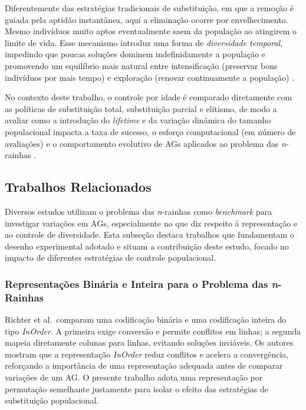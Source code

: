 Diferentemente das estratégias tradicionais de substituição, em que a remoção é guiada pela aptidão instantânea, aqui a eliminação ocorre por envelhecimento. Mesmo indivíduos muito aptos eventualmente saem da população ao atingirem o limite de vida. Esse mecanismo introduz uma forma de \textit{diversidade temporal}, impedindo que poucas soluções dominem indefinidamente a população e promovendo um equilíbrio mais natural entre intensificação (preservar bons indivíduos por mais tempo) e exploração (renovar continuamente a população) \cite{michalewicz1993genetic}.

No contexto deste trabalho, o controle por idade é comparado diretamente com as políticas de substituição total, substituição parcial e elitismo, de modo a avaliar como a introdução do \textit{lifetime} e da variação dinâmica do tamanho populacional impacta a taxa de sucesso, o esforço computacional (em número de avaliações) e o comportamento evolutivo de AGs aplicados ao problema das \textit{n}-rainhas \cite{richter2012algoritmo,sarkar2017adaptive,ali2023performance}.
\subsection{Trabalhos Relacionados}

Diversos estudos utilizam o problema das \textit{n}-rainhas como \textit{benchmark} para investigar variações em AGs, especialmente no que diz respeito à representação e ao controle de diversidade. Esta subseção destaca trabalhos que fundamentam o desenho experimental adotado e situam a contribuição deste estudo, focado no impacto de diferentes estratégias de controle populacional.

\subsubsection{Representações Binária e Inteira para o Problema das \textit{n}-Rainhas \cite{richter2012algoritmo}}

Richter et al.\ comparam uma codificação binária e uma codificação inteira do tipo \textit{InOrder}. A primeira exige conversão e permite conflitos em linhas; a segunda mapeia diretamente colunas para linhas, evitando soluções inviáveis. Os autores mostram que a representação \textit{InOrder} reduz conflitos e acelera a convergência, reforçando a importância de uma representação adequada antes de comparar variações de um AG. O presente trabalho adota uma representação por permutação semelhante justamente para isolar o efeito das estratégias de substituição populacional.

